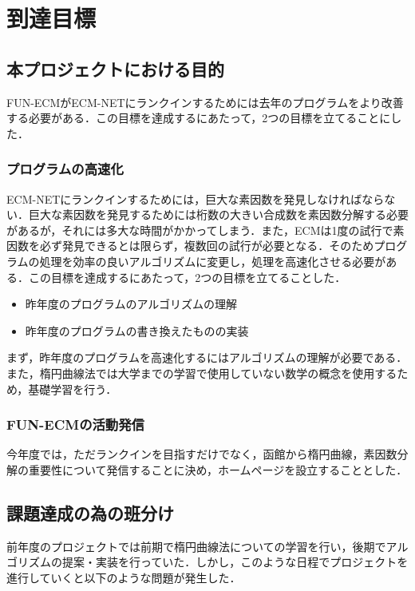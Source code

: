 \documentclass[openany,11pt,papersize]{jsbook}
\begin{document}

\chapter{到達目標}

\section{本プロジェクトにおける目的}\label{sec:mokuteki}

FUN-ECMがECM-NETにランクインするためには去年のプログラムをより改善する必要がある．この目標を達成するにあたって，2つの目標を立てることにした．


\subsection{プログラムの高速化}\label{sec:goal1}

ECM-NETにランクインするためには，巨大な素因数を発見しなければならない．巨大な素因数を発見するためには桁数の大きい合成数を素因数分解する必要があるが，それには多大な時間がかかってしまう．また，ECMは1度の試行で素因数を必ず発見できるとは限らず，複数回の試行が必要となる．そのためプログラムの処理を効率の良いアルゴリズムに変更し，処理を高速化させる必要がある．この目標を達成するにあたって，2つの目標を立てることした．

\begin{itemize}
\item 昨年度のプログラムのアルゴリズムの理解
\item 昨年度のプログラムの書き換えたものの実装
\end{itemize}

まず，昨年度のプログラムを高速化するにはアルゴリズムの理解が必要である．また，楕円曲線法では大学までの学習で使用していない数学の概念を使用するため，基礎学習を行う．


\subsection{FUN-ECMの活動発信}\label{sec:goal2}

今年度では，ただランクインを目指すだけでなく，函館から楕円曲線，素因数分解の重要性について発信することに決め，ホームページを設立することとした．


\section{課題達成の為の班分け}
前年度のプロジェクトでは前期で楕円曲線法についての学習を行い，後期でアルゴリズムの提案・実装を行っていた．しかし，このような日程でプロジェクトを進行していくと以下のような問題が発生した．
\end{document}
